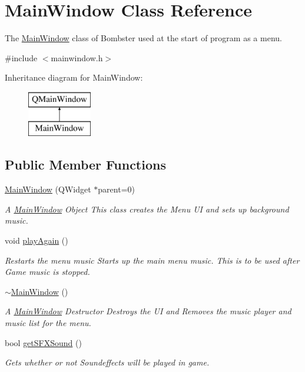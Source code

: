\hypertarget{class_main_window}{\section{Main\-Window Class Reference}
\label{class_main_window}
}


The \hyperlink{class_main_window}{Main\-Window} class of Bombster used at the start of program as a menu.  




{\ttfamily \#include $<$mainwindow.\-h$>$}

Inheritance diagram for Main\-Window\-:\begin{figure}[H]
\begin{center}
\leavevmode
\includegraphics[height=2.000000cm]{class_main_window}
\end{center}
\end{figure}
\subsection*{Public Member Functions}
\begin{DoxyCompactItemize}
\item 
\hyperlink{class_main_window_a8b244be8b7b7db1b08de2a2acb9409db}{Main\-Window} (Q\-Widget $\ast$parent=0)
\begin{DoxyCompactList}\small\item\em A \hyperlink{class_main_window}{Main\-Window} Object This class creates the Menu U\-I and sets up background music. \end{DoxyCompactList}\item 
void \hyperlink{class_main_window_ab622d7f3b4082b8221185e216991e602}{play\-Again} ()
\begin{DoxyCompactList}\small\item\em Restarts the menu music Starts up the main menu music. This is to be used after Game music is stopped. \end{DoxyCompactList}\item 
\hyperlink{class_main_window_ae98d00a93bc118200eeef9f9bba1dba7}{$\sim$\-Main\-Window} ()
\begin{DoxyCompactList}\small\item\em A \hyperlink{class_main_window}{Main\-Window} Destructor Destroys the U\-I and Removes the music player and music list for the menu. \end{DoxyCompactList}\item 
bool \hyperlink{class_main_window_a3935a5aee4fcdbc9568995da6ceed437}{get\-S\-F\-X\-Sound} ()
\begin{DoxyCompactList}\small\item\em Gets whether or not Soundeffects will be played in game. \end{DoxyCompactList}\end{DoxyCompactItemize}
